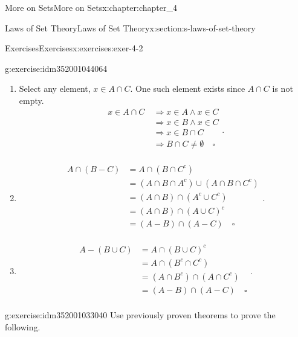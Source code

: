 \documentclass[oneside,10pt,]{book}
\begin{document}
\begin{chapterptx}{More on Sets}{}{More on Sets}{}{}{x:chapter:chapter_4}
\begin{sectionptx}{Laws of Set Theory}{}{Laws of Set Theory}{}{}{x:section:s-laws-of-set-theory}
\begin{exercises-subsection}{Exercises}{}{Exercises}{}{}{x:exercises:exer-4-2}
\begin{divisionexercise}{3}{}{}{g:exercise:idm352001044064}
\begin{enumerate}[label=(\alph*)]
\begin{equation*}
\begin{split}
A - B & = A \cap B ^c\\
&  =B^c\cap A\\
&=B^c\cap (A^c)^c\\
&=B^c-A^c\\
\end{split}\text{.}
\end{equation*}
%
\item{}Select any element, \(x \in A\cap C\). One such element exists since \(A\cap C\) is not empty.%
\begin{equation*}
\begin{split}
x\in A\cap C\  &\Rightarrow x\in A \land x\in C \\
& \Rightarrow x\in B \land x\in C \\
& \Rightarrow x\in B\cap C \\
& \Rightarrow B\cap C \neq \emptyset \quad \square \\
\end{split}\text{.}
\end{equation*}
%
\item{}%
\begin{equation*}
\begin{split}
A\cap (B-C) &=A\cap (B\cap C^c) \\
& = (A\cap B\cap A^c)\cup (A\cap B\cap C^c) \\
& =(A\cap B)\cap (A^c\cup C^c) \\
& =(A\cap B)\cap (A\cup C)^c \\
& =(A-B)\cap (A-C) \quad \square\\
\end{split}\text{.}
\end{equation*}
%
\item{}%
\begin{equation*}
\begin{split}
A-(B\cup C)& = A\cap (B\cup C)^c\\
& =A\cap (B^c\cap C^c)\\
& =(A\cap B^c)\cap (A\cap C^c)\\
& =(A-B)\cap (A-C)  \quad \square\\
\end{split}\text{.}
\end{equation*}
%
\end{enumerate}
%
\end{divisionexercise}%
\begin{divisionexercise}{4}{}{}{g:exercise:idm352001033040}%
Use previously proven theorems to prove the following.%

\end{divisionexercise}
\end{exercises-subsection}
\end{sectionptx}
\end{chapterptx}
\end{document}
